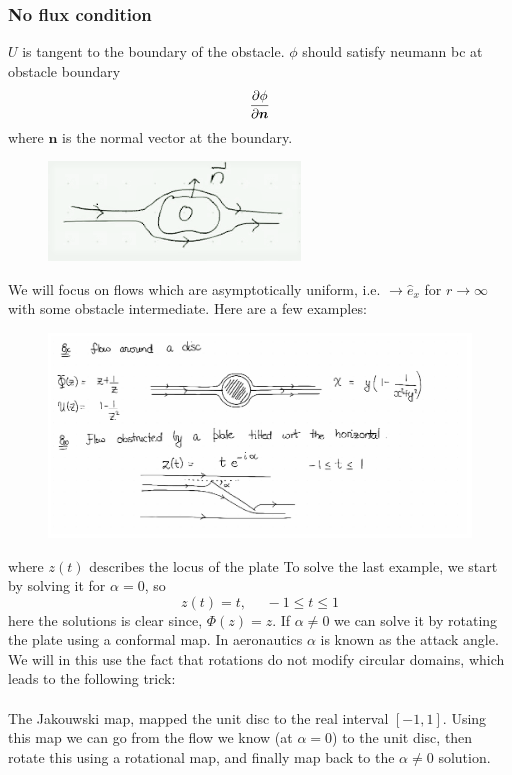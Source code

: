 \documentclass[a4paper,12pt]{article}
\begin{document}
\subsubsection{No flux condition}
$U$ is tangent to the boundary of the obstacle. $\phi$ should satisfy neumann bc at obstacle boundary
\begin{equation}
\pdv{\phi}{\bm n}
\end{equation} 
where $\bm n$ is the normal vector at the boundary.
\begin{figure}[H]
	\centering
	\includegraphics[width=0.6\linewidth]{9}
	\caption{}
	\label{fig:4}
\end{figure}
We will focus on flows which are asymptotically uniform, i.e. $\bm\to\hat e_x$ for $r\to \infty$ with some obstacle intermediate. Here are a few examples:
\begin{figure}[H]
	\centering
	\includegraphics[width=0.9\linewidth]{10}
	\caption{}
	\label{fig:4}
\end{figure}
where $z(t)$ describes the locus of the plate
To solve the last example, we start by solving it for $\alpha=0$, so
\begin{equation}
z(t)=t,~~~~~~-1\leq t \leq 1
\end{equation}
here the solutions is clear since,
$\Phi(z)=z$. If $\alpha\neq 0$ we can solve it by rotating the plate using a conformal map. In aeronautics $\alpha$ is known as the attack angle. We will in this use the fact that rotations do not modify circular domains, which leads to the following trick:\\\\
The  Jakouwski map, mapped the unit disc to the real interval $[-1,1]$. Using this map we can go from the flow we know (at $\alpha=0$) to the unit disc, then rotate this using a rotational map, and finally map back to the $\alpha\neq 0$ solution.\\\\
\end{document}
